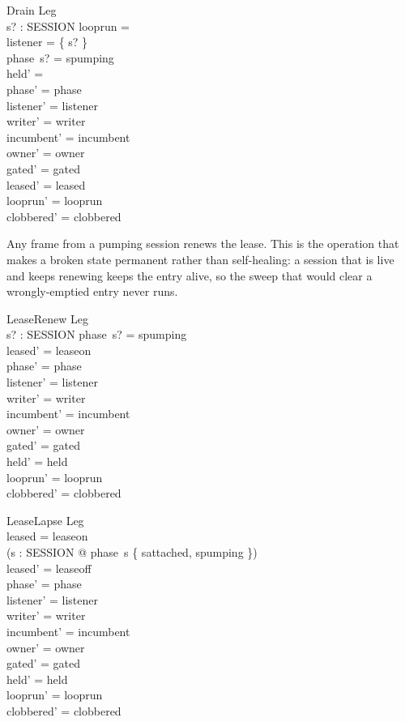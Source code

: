 \documentclass[a4paper,10pt,fleqn]{article}
\begin{document}
\begin{schema}{Drain}
  \Delta Leg \\
  s? : SESSION
\where
  looprun = \emptyset \\
  listener = \{ s? \} \\
  phase~s? = spumping \\
  held' = \emptyset \\
  phase' = phase \\
  listener' = listener \\
  writer' = writer \\
  incumbent' = incumbent \\
  owner' = owner \\
  gated' = gated \\
  leased' = leased \\
  looprun' = looprun \\
  clobbered' = clobbered
\end{schema}

Any frame from a pumping session renews the lease.  This is the
operation that makes a broken state permanent rather than self-healing:
a session that is live and keeps renewing keeps the entry alive, so the
sweep that would clear a wrongly-emptied entry never runs.

\begin{schema}{LeaseRenew}
  \Delta Leg \\
  s? : SESSION
\where
  phase~s? = spumping \\
  leased' = leaseon \\
  phase' = phase \\
  listener' = listener \\
  writer' = writer \\
  incumbent' = incumbent \\
  owner' = owner \\
  gated' = gated \\
  held' = held \\
  looprun' = looprun \\
  clobbered' = clobbered
\end{schema}

\begin{schema}{LeaseLapse}
  \Delta Leg \\
\where
  leased = leaseon \\
  \lnot (\exists s : SESSION @ phase~s \in \{ sattached, spumping \}) \\
  leased' = leaseoff \\
  phase' = phase \\
  listener' = listener \\
  writer' = writer \\
  incumbent' = incumbent \\
  owner' = owner \\
  gated' = gated \\
  held' = held \\
  looprun' = looprun \\
  clobbered' = clobbered
\end{schema}
\end{document}
